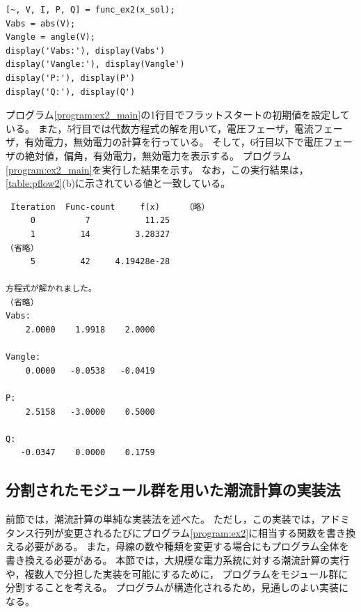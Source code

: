 \documentclass[tombow,dvipdfmx]{corona-a5-1.1}
\begin{document}
\begin{例}[潮流計算の実装法]
\begin{PROGRAMA}[count,title={main\_ex2.m}]
\begin{verbatim}
[~, V, I, P, Q] = func_ex2(x_sol);
Vabs = abs(V);
Vangle = angle(V);
display('Vabs:'), display(Vabs')
display('Vangle:'), display(Vangle')
display('P:'), display(P')
display('Q:'), display(Q')
\end{verbatim}
\end{PROGRAMA}

プログラム\nobreak\ref{program:ex2_main}の1行目でフラットスタートの初期値を設定している。
また，5行目では代数方程式の解を用いて，電圧フェーザ，電流フェーザ，有効電力，無効電力の計算を行っている。
そして，6行目以下で電圧フェーザの絶対値，偏角，有効電力，無効電力を表示する。
プログラム\nobreak\ref{program:ex2_main}を実行した結果を示す。
なお，この実行結果は，\ref{table:pflow2}(b)に示されている値と一致している。

\smallskip
\begin{実行結果}
\begin{verbatim}
 Iteration  Func-count     f(x)     （略）
     0          7           11.25 
     1         14         3.28327 
（省略）
     5         42     4.19428e-28

方程式が解かれました。
（省略）
Vabs:
    2.0000    1.9918    2.0000

Vangle:
    0.0000   -0.0538   -0.0419

P:
    2.5158   -3.0000    0.5000

Q:
   -0.0347    0.0000    0.1759
\end{verbatim}
\end{実行結果}

\end{例}

\subsection{分割されたモジュール群を用いた潮流計算の実装法}

前節では，潮流計算の単純な実装法を述べた。
ただし，この実装では，アドミタンス行列が変更されるたびにプログラム\ref{program:ex2}に相当する関数を書き換える必要がある。
また，母線の数や種類を変更する場合にもプログラム全体を書き換える必要がある。
本節では，大規模な電力系統に対する潮流計算の実行や，複数人で分担した実装を可能にするために，
プログラムをモジュール群に分割することを考える。
プログラムが構造化されるため，見通しのよい実装になる。
\end{document}
